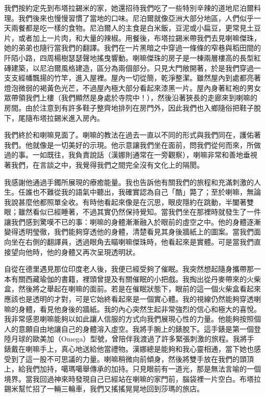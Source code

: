 我們按約定先到布塔拉錫米的家，她還招待我們吃了一些特別辛辣的道地尼泊爾料理。我們後來也慢慢習慣了當地的口味。尼泊爾就像亞洲大部分地區，人們似乎一天兩餐都是吃一樣的食物。尼泊爾人的主食是白米飯，豆泥或小扁豆，更常見土豆片，或者加上一片肉，和大量的辣椒。用餐後，布塔拉錫米帶我們去見喇嘛傑珠，她的弟弟也隨行當我們的翻譯。我們在一片黑暗之中穿過一條條的窄巷與稻田間的阡陌小路，四周楊樹瑟瑟聲地搖曳響動。喇嘛傑珠的房子是一棟兩層樓高的長型紅磚建築，以尼泊爾風格建造，區分為兩個部分。只見大門敞開著，於是我們穿過一支支經幡飄揚的竹竿，進入屋裡。屋內一切從簡，乾淨整潔。雖然屋內到處都亮著燈泡微弱的褐黃色光芒，不過屋內極大部分看起來漆黑一片。屋內身著紅袍的男女眾帶領我們上樓（我們顯然是身處於寺院中！），然後沿著狹長的走廊來到喇嘛的房間。由於注意到有許多鞋子整齊地排列在房門外，因此我們也入鄉隨俗把鞋子脫下，尾隨布塔拉錫米進入房內。

我們終於和喇嘛見面了。喇嘛的教法在過去一直以不同的形式與我們同在，護佑著我們。他就像是一切美好的示現。他示意讓我們坐在面前，問我們從何而來，所做過的事。一如既往，我負責說話（漢娜則通常在一旁觀察），喇嘛非常和善地垂視著我們，在言談之中，我覺得我們之間完全沒有文化上的隔閡。

我感謝他通過手鐲所展現的療癒能量。我也告訴他有關我們的旅程和充滿刺激的人生。任誰也不難從我的語氣中聽出，我確實認為自己「酷」斃了；至於喇嘛，無論我說甚麼他都照單全收。有時他看起來像是在沉思，眼皮隱約在跳動，半闔著雙眼；雖然看似已經睡著，不過其實仍然保持覺知。當我們坐在那裡時就發生了一件讓我們感到驚嘆不已的事：喇嘛的身體漸漸融入於眼前的虛空之中。他的身體逐漸變得透明瑩徹，我們能夠穿透他的身體，清楚看見其身後牆紙上的圖案。當我們面向坐在右側的翻譯員，透過眼角去瞄喇嘛傑珠時，他看起來是實體。可是當我們直接望向他時，他的身體又再次呈現透明狀。

自從在德里遇見那位印度老人後，我便已經受夠了催眠。我突然想起隨身攜帶那一本有關西藏瑜伽的書籍，裡頭曾提及有關催眠的小把戲。我掏出從丹麥帶來的火柴盒，然後將之舉起在喇嘛的面前。若是在催眠狀態下，眼前的這一個火柴盒看起來應該也是透明的才對，可是它始終看起來是一個實心體。我的視線仍然能夠穿透喇嘛的身體，看見他身後的牆紙。我的內心突然生起非常強烈的信心和極大的喜悅。我非常感恩喇嘛能夠以如此讓人信服的方式向我們展現心性的力量。他能夠按照個人的意願自由地讓自己的身體溶入虛空。我將手腕上的錶脫下。這手錶是第一個登陸月球的歐美加（Omega）型號，曾陪伴我渡過了許多緊張刺激的旅程。我將手錶戴在喇嘛手上，真心地送給他當禮物。漢娜總是能夠和我心靈相通，當下她也感受到了這一股不可思議的力量。喇嘛稍微向前傾身，然後將雙手放在我們的頭頂上，給我們加持，噶瑪噶舉傳承的加持。只見眼前有一道光，那是無法言喻的一個境界。當我回過神來時發現自己已經站在喇嘛的家門前，腦袋裡一片空白。布塔拉錫米幫忙招了一輛三輪車，我們又搖搖晃晃地回到莎瑪的旅店。

